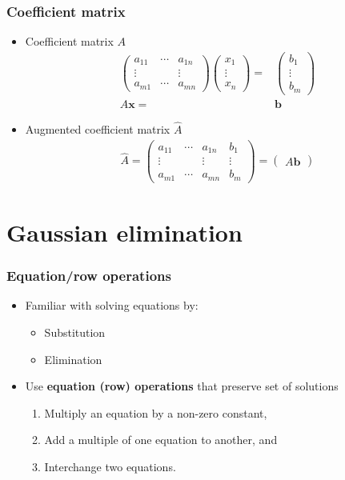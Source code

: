 \documentclass[compress]{beamer}
\begin{document}
\begin{frame}
  \frametitle{Coefficient matrix}
  \begin{itemize}
  \item Coefficient matrix $A$
    \begin{align*}
      \begin{pmatrix} a_{11} &  \cdots & a_{1n} \\
        \vdots & & \vdots \\
        a_{m1} & \cdots & a_{mn} 
      \end{pmatrix} 
      \begin{pmatrix} x_1 \\ \vdots \\ x_n
      \end{pmatrix} = & \begin{pmatrix} b_1 \\ \vdots \\ b_m
      \end{pmatrix} \\
      A \mathbf{x} = & \mathbf{b}
    \end{align*}
  \item Augmented coefficient matrix $\hat{A}$
    \begin{align*}
      \hat{A} =   \begin{pmatrix} a_{11} &  \cdots & a_{1n} & b_1 \\
        \vdots & & \vdots & \vdots \\
        a_{m1} & \cdots & a_{mn} & b_m 
      \end{pmatrix}  = \begin{pmatrix} A \mathbf{b}
      \end{pmatrix}
    \end{align*}
  \end{itemize}
\end{frame}

\section{Gaussian elimination}

\begin{frame}
  \frametitle{Equation/row operations}
  \begin{itemize}
  \item Familiar with solving equations by:
    \begin{itemize}
    \item Substitution
    \item Elimination
    \end{itemize}
  \item Use \textbf{equation (row) operations} that preserve set of
    solutions
    \begin{enumerate}
    \item Multiply an equation by a non-zero constant,
    \item Add a multiple of one equation to another, and
    \item Interchange two equations.
    \end{enumerate}
  \end{itemize}
\end{frame}
\end{document}
